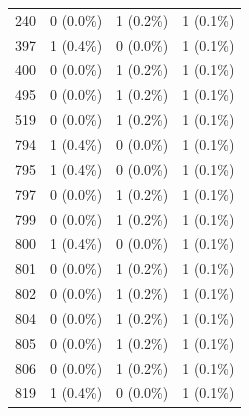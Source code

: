 \documentclass{article}
\begin{document}
\begin{table}[hbt!]
{\begin{tabular}{cccc}
240                                       & 0 (0.0\%)       & 1 (0.2\%)          & 1 (0.1\%)       \\
397                                       & 1 (0.4\%)       & 0 (0.0\%)          & 1 (0.1\%)       \\
400                                       & 0 (0.0\%)       & 1 (0.2\%)          & 1 (0.1\%)       \\
495                                       & 0 (0.0\%)       & 1 (0.2\%)          & 1 (0.1\%)       \\
519                                       & 0 (0.0\%)       & 1 (0.2\%)          & 1 (0.1\%)       \\
794                                       & 1 (0.4\%)       & 0 (0.0\%)          & 1 (0.1\%)       \\
795                                       & 1 (0.4\%)       & 0 (0.0\%)          & 1 (0.1\%)       \\
797                                       & 0 (0.0\%)       & 1 (0.2\%)          & 1 (0.1\%)       \\
799                                       & 0 (0.0\%)       & 1 (0.2\%)          & 1 (0.1\%)       \\
800                                       & 1 (0.4\%)       & 0 (0.0\%)          & 1 (0.1\%)       \\
801                                       & 0 (0.0\%)       & 1 (0.2\%)          & 1 (0.1\%)       \\
802                                       & 0 (0.0\%)       & 1 (0.2\%)          & 1 (0.1\%)       \\
804                                       & 0 (0.0\%)       & 1 (0.2\%)          & 1 (0.1\%)       \\
805                                       & 0 (0.0\%)       & 1 (0.2\%)          & 1 (0.1\%)       \\
806                                       & 0 (0.0\%)       & 1 (0.2\%)          & 1 (0.1\%)       \\
819                                       & 1 (0.4\%)       & 0 (0.0\%)          & 1 (0.1\%)      
\end{tabular}%
}
\end{table}
\end{document}
